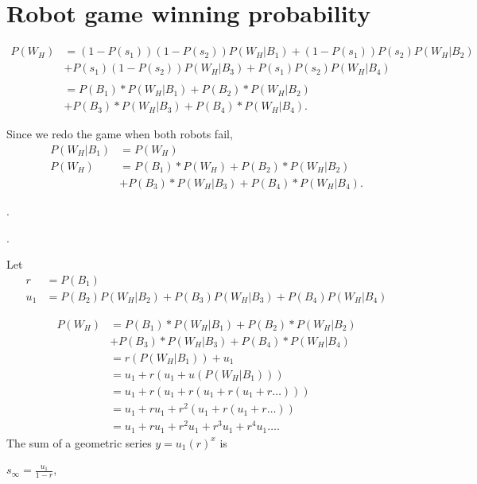 \documentclass[11pt]{article}
\begin{document}
\section{Robot game winning probability}


\begin{align*}
    P(W_{H})&= (1-P(s_1))(1-P(s_2))P(W_H | B_1) + (1-P(s_1))P(s_2)P(W_H | B_2)\\
    &+ P(s_1)(1-P(s_2))P(W_H | B_3) + P(s_1)P(s_2)P(W_H | B_4)\\
    \\
    &= P(B_{1}) * P(W_{H} | B_{1}) + P(B_{2}) * P(W_{H} | B_{2}) \\
    &+ P(B_{3}) * P(W_{H} | B_{3}) + P(B_{4}) * P(W_{H} | B_{4}).
\end{align*}

Since we redo the game when both robots fail, 
\begin{align*}
    P(W_H | B_1) &= P(W_{H})\\
    P(W_H) &= P(B_{1}) * P(W_{H}) + P(B_{2}) * P(W_{H} | B_{2})\\
    &+ P(B_{3}) * P(W_{H} | B_{3}) + P(B_{4}) * P(W_{H} | B_{4}).
\end{align*}

.

.


Let
\begin{align*}
    r &= P(B_1)\\
    u_1 &= P(B_2)P(W_H | B_2) + P(B_3)P(W_H | B_3) + P(B_4)P(W_H | B_4)
\end{align*}



\begin{align*}
    P(W_H) &= P(B_{1}) * P(W_{H} | B_{1}) + P(B_{2}) * P(W_{H} | B_{2})\\
    &+ P(B_{3}) * P(W_{H} | B_{3}) + P(B_{4}) * P(W_{H} | B_{4})\\
    &= r(P(W_{H} | B_1)) + u_1\\
    &= u_1 + r(u_1 + u(P(W_{H} | B_1)))\\
    &= u_1 + r(u_1 + r(u_1 + r(u_1 + r\dots)))\\
    &= u_1 + ru_1 + r^2(u_1 + r(u_1 + r\dots))\\
    &= u_1 + ru_1 + r^2 u_1 + r^3 u_1 + r^4 u_1\dots.
\end{align*}
The sum of a geometric series \(y = u_1 (r)^x \) is

\(s_{\infty} = \frac{u_1}{1-r}\),
\end{document}
